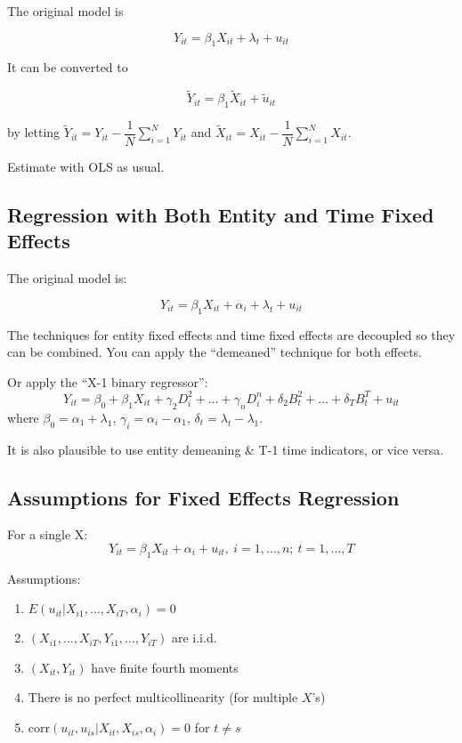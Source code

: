 \documentclass{article}
\newcommand{\sumlimitsN}{\sum \limits _{i=1}^{N}}
\begin{document}
The original model is

\[
	Y_{it} = \beta_1 X_{it} + \lambda_t + u_{it}
\]

It can be converted to

\[
	\tilde{Y}_{it} = \beta_1 \tilde{X}_{it} + \tilde{u}_{it}
\]

by letting $\tilde{Y}_{it} = Y_{it} - \dfrac{1}{N}\sumlimitsN Y_{it}$
and $\tilde{X}_{it} = X_{it} - \dfrac{1}{N}\sumlimitsN X_{it}$.

Estimate with OLS as usual.

\subsection{Regression with Both Entity and Time Fixed Effects}

The original model is:

\[
	Y_{it} = \beta_1 X_{it} + \alpha_i + \lambda_t + u_{it}
\]

The techniques for entity fixed effects and time fixed effects are decoupled so they can be combined.
You can apply the ``demeaned'' technique for both effects.

Or apply the ``X-1 binary regressor'':
\[
	Y_{it} = \beta_0 + \beta_1 X_{it} + \gamma_2 D^2_i + \ldots + \gamma_n D^n_i
		+ \delta_2 B^2_t + \ldots + \delta_T B^T_t + u_{it}
\]
where $\beta_0 = \alpha_1 + \lambda_1$, $\gamma_i = \alpha_i - \alpha_1$, $\delta_t = \lambda_t - \lambda_1$.

It is also plausible to use entity demeaning \& T-1 time indicators, or vice versa.

\subsection{Assumptions for Fixed Effects Regression}

For a single X:
\[
	Y_{it} = \beta_1 X_{it} + \alpha_i + u_{it},\ i=1, \ldots, n;\ t=1, \ldots, T
\]

Assumptions:
\begin{enumerate}
	\item $E(u_{it} | X_{i1}, \ldots, X_{iT}, \alpha_i)= 0$
	\item $(X_{i1}, \ldots, X_{iT}, Y_{i1}, \ldots, Y_{iT})$ are i.i.d.
	\item $(X_{it}, Y_{it})$ have finite fourth moments
	\item There is no perfect multicollinearity (for multiple $X$'s)
	\item $\text{corr}(u_{it}, u_{is} | X_{it}, X_{is}, \alpha_i) = 0$ for $t\neq s$
\end{enumerate}
\end{document}
